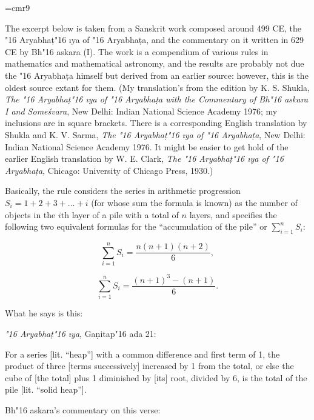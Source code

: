 {
\narrower
\font\ninerm=cmr9
\ninerm
\def\=#1{\accent"16 #1}

 The excerpt below is taken
 from a Sanskrit work composed around 499 CE, the \=Aryabha\d t\={\i}ya
 of \=Aryabha\d ta, and the commentary on it written in 629 CE
 by Bh\=askara (I).  The work is a compendium of various rules in
 mathematics and mathematical astronomy, and the results are probably
 not due the \=Aryabha\d ta himself but derived from an earlier source:
 however, this is the oldest source extant for them.  (My translation's
 from the edition by K. S. Shukla, {\it The \=Aryabha\d t\={\i}ya of
 \=Aryabha\d ta with the Commentary of Bh\=askara I and Some\'svara},
 New Delhi: Indian National Science Academy 1976; my inclusions are
 in square brackets. There is a corresponding English translation
 by Shukla and K. V. Sarma, {\it The \=Aryabha\d t\={\i}ya
 of \=Aryabha\d ta}, New Delhi: Indian National Science Academy 1976.
 It might be easier to get hold of the earlier English translation by
 W. E. Clark, {\it The \=Aryabha\d t\={\i}ya of \=Aryabha\d ta},
 Chicago: University of Chicago Press, 1930.)

      Basically, the rule considers the series in arithmetic
 progression
 $
 S_i = 1 + 2 + 3 + \ldots + i
 $
 (for whose sum the formula is known) as the number of objects
 in the $i$th layer of a pile with a total of $n$ layers, and
 specifies the following two equivalent formulas for the ``accumulation
 of the pile'' or $ \sum_{i=1}^n S_i $:

 $$
 \sum_{i=1}^n S_i = \frac{{n(n+1)(n+2)}}{6},
 $$

 $$
 \sum_{i=1}^n S_i = \frac{{(n+1)^3 - (n+1)}}{6}.
 $$

 What he says is this:

 {\it \=Aryabha\d t\={\i}ya}, Ga\d nitap\=ada 21:

 {\narrower
    For a series [lit. ``heap''] with a common difference and first term
 of 1, the product of three [terms successively] increased by 1 from
 the total, or else the cube of [the total] plus 1 diminished by [its]
 root, divided by 6, is the total of the pile [lit. ``solid heap''].
 }

 Bh\=askara's commentary on this verse:

}

